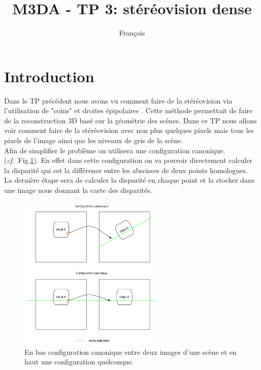 \documentclass[a4paper,10pt]{article}
\title{M3DA - TP 3: st\'er\'eovision dense}
\author{Fran\c cois \bsc{Lepan}}
\begin{document}
\maketitle

\section*{Introduction}

Dans le TP pr\'ec\'edent nous avons vu comment faire de la st\'er\'eovision via l'utilisation de "coins" et droites \'epipolaires . Cette m\'ethode permettait de faire de la reconstruction 3D bas\'e sur la g\'eom\'etrie des sc\`enes. Dans ce TP nous allons voir comment faire de la st\'er\'eovision avec non plus quelques pixels mais tous les pixels de l'image  ainsi que les niveaux de gris de la sc\`ene. \\

Afin de simplifier le probl\`eme on utilisera une configuration canonique. (\emph{cf.}~Fig.\ref{conf_canonique}). En effet dans cette configuration on va pouvoir directement calculer la disparit\'e qui est la diff\'erence entre les abscisses de deux points homologues. \\

La derni\`ere \'etape sera de calculer la disparit\'e en chaque point et la stocker dans une image nous donnant la carte des disparit\'es.

\begin{figure}[ht]
\begin{center}
	\includegraphics[width=7cm]{images/confi_canonique}
\end{center}
	\caption{En bas configuration canonique entre deux images d'une sc\`ene et en haut une configuration quelconque.}
	\label{conf_canonique}
\end{figure}
\end{document}
